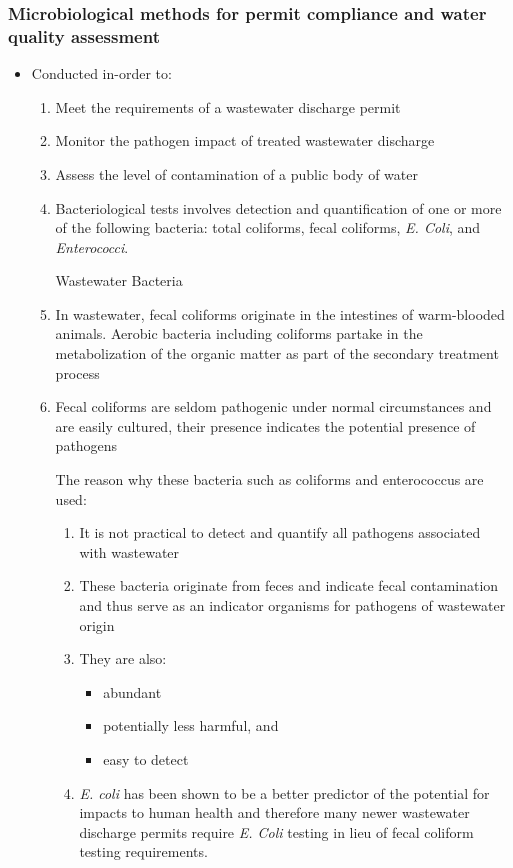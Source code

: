 				\subsubsection{Microbiological methods for permit compliance and water quality assessment}				
\begin{itemize}
	\item Conducted in-order to:
		\begin{enumerate}
			\item Meet the requirements of a wastewater discharge permit
			\item Monitor the pathogen impact of treated wastewater discharge
			\item Assess the level of contamination of a public body of water
			\item Bacteriological tests involves detection and quantification of one or more of the following bacteria:  total coliforms, fecal coliforms, \textit{E. Coli}, and \textit{Enterococci}. 
\begin{center}
Wastewater Bacteria
\end{center}
	
	\item  In wastewater, fecal coliforms originate in the intestines of warm-blooded animals.  Aerobic bacteria including coliforms partake in the metabolization of the organic matter as part of the secondary treatment process
\item Fecal coliforms are seldom pathogenic under normal circumstances and are easily cultured, their presence indicates the potential presence of pathogens

The reason why these bacteria such as coliforms and enterococcus are used:
		\begin{enumerate}
			\item It is not practical to detect and quantify all pathogens associated with wastewater
			\item These bacteria originate from feces and indicate fecal contamination and thus serve as an indicator organisms for pathogens of wastewater origin
			\item They are also:
				\begin{itemize}
					\item abundant
					\item potentially less harmful, and
					\item easy to detect
				\end{itemize}
			\item \textit{E. coli} has been shown to be a better predictor of the potential for impacts to human health and therefore many newer wastewater discharge permits require \textit{E. Coli} testing in lieu of fecal coliform testing requirements.
		\end{enumerate}
		\end{enumerate}

\end{itemize}


